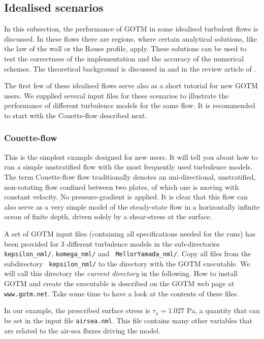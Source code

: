 \subsection{Idealised scenarios}

In this subsection, the performance of GOTM in some idealised
turbulent flows is discussed. In these flows there are regions, where
certain analytical solutions, like the law of the wall or the Rouse
profile, apply. These solutions can be used to test the correctness of
the implementation and the accuracy of the numerical schemes. The
theoretical background is discussed in  and
in the review article of \cite{UmlaufBurchard2005a}.

The first few of these idealised flows serve also as a short tutorial
for new GOTM users. We supplied several input files for these
scenarios to illustrate the performance of different turbulence models
for the same flow. It is recommended to start with the Couette-flow
described next.

\subsubsection{Couette-flow}\label{couette}

This is the simplest example designed for new users. It will tell you
about how to run a simple unstratified flow with the most frequently
used turbulence models. The term Couette-flow flow traditionally
denotes an uni-directional, unstratified, non-rotating flow confined
between two plates, of which one is moving with constant velocity. No
pressure-gradient is applied.  It is clear that this flow can also
serve as a very simple model of the steady-state flow in a
horizontally infinite ocean of finite depth, driven solely by a
shear-stress at the surface.

A set of GOTM input files (containing all specifications needed for
the runs) has been provided for 3 different turbulence models in the
sub-directories {\tt kepsilon\_nml/}, {\tt komega\_nml/} and {\tt
MellorYamada\_nml/}.  Copy all files from the subdirectory {\tt
kepsilon\_nml/} to the directory with the GOTM executable. We will
call this directory the \emph{current directory} in the following. How
to install GOTM and create the executable is described on the GOTM web
page at {\tt www.gotm.net}.  Take some time to have a look at the
contents of these files. 

In our example, the prescribed surface stress is $\tau_x= 1.027$ Pa, a
quantity that can be set in the input file {\tt airsea.nml}. This file
contains many other variables that are related to the air-sea fluxes
driving the model.

